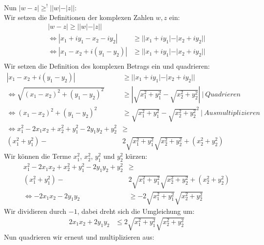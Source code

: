 \documentclass{article}
\begin{document}
\begin{enumerate}[ label = (\alph*) ]
\begin{enumerate}
            Nun \( |w-z| \geq^! ||w|-|z|| \): \\
            Wir setzen die Definitionen der komplexen Zahlen \(w, z\) ein:
            \begin{align*}
                |w-z| \geq ||w|-|z|| \\
                \Leftrightarrow | x_1 + iy_1 - x_2 -iy_2 | & \geq ||x_1 + iy_1| - |x_2 + iy_2|| \\
                \Leftrightarrow | x_1 - x_2 + i(y_1 -y_2) | & \geq ||x_1 + iy_1| - |x_2 + iy_2|| \\
            \end{align*}
            Wir setzen die Definition des komplexen Betrags ein und quadrieren:
            \begin{align*}
                | x_1 - x_2 + i(y_1 -y_2) | & \geq ||x_1 + iy_1| - |x_2 + iy_2|| \\
                \Leftrightarrow \sqrt{ {(x_1 - x_2)}^2 + {( y_1 - y_2)}^2 } & \geq | \sqrt{ x_1^2 + y_1^2 } - \sqrt{ x_2^2 + y_2^2 } | \ | \ Quadrieren \\
                \Leftrightarrow {(x_1 - x_2)}^2 + {( y_1 - y_2)}^2 & \geq { \sqrt{ x_1^2 + y_1^2 } - \sqrt{ x_2^2 + y_2^2 } }^2 \ | \ Ausmultiplizieren \\
                \Leftrightarrow x_1^2 - 2 x_1 x_2 + x_2^2 + y_1^2 - 2 y_1 y_2 + y_2^2 & \geq \\
                (x_1^2 + y_1^2) - &2 \sqrt{ x_1^2 + y_1^2 } \sqrt{ x_2^2 + y_2^2 } + (x_2^2 + y_2^2)
            \end{align*}
            Wir können die Terme \(x_1^2\), \(x_2^2\), \(y_1^2\) und \(y_2^2\) kürzen:
            \begin{align*}
                x_1^2 - 2 x_1 x_2 + x_2^2 + y_1^2 - 2 y_1 y_2 + y_2^2 & \geq \\
                (x_1^2 + y_1^2) - &2 \sqrt{ x_1^2 + y_1^2 } \sqrt{ x_2^2 + y_2^2 } + (x_2^2 + y_2^2) \\
                \Leftrightarrow - 2 x_1 x_2 - 2 y_1 y_2 & \geq - 2 \sqrt{ x_1^2 + y_1^2 } \sqrt{ x_2^2 + y_2^2 }
            \end{align*}
            Wir dividieren durch \(-1\), dabei dreht sich die Umgleichung um:
            \begin{align*}
                2 x_1 x_2 + 2 y_1 y_2 & \leq 2 \sqrt{ x_1^2 + y_1^2 } \sqrt{ x_2^2 + y_2^2 }
            \end{align*}
            Nun quadrieren wir erneut und multiplizieren aus:
            \begin{align*}

\end{align*}
\end{enumerate}
\end{enumerate}
\end{document}
